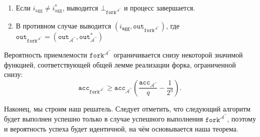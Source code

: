\documentclass{mrl}
\theoremstyle{definition}
\numberwithin{theorem}{subsection}
\newcommand{\adversary}{\mathcal{A}}
\begin{document}
\begin{description}
\begin{enumerate}
\item Если $i_{\text{agg}} \neq i_{\text{agg}}^*$, выводится $\bot_{\texttt{fork}^{\adversary^{\prime \prime}}}$ и процесс завершается.

\item В противном случае выводится $(i_{\texttt{agg}}, \texttt{out}_{\texttt{fork}^{\adversary^{\prime \prime}}})$, где $\texttt{out}_{\texttt{fork}^{\adversary^{\prime \prime}}} = (\texttt{out}_{\adversary^{\prime \prime}}, \texttt{out}_{\adversary^{\prime \prime}}^*)$
\end{enumerate}
\end{description}


Вероятность приемлемости $\texttt{fork}^{\adversary^{\prime \prime}}$ ограничивается снизу некоторой значимой функцией, соответствующей общей лемме реализации форка, ограниченной снизу:
\[\texttt{acc}_{\texttt{fork}^{\adversary^{\prime \prime}}}
\geq \texttt{acc}_{\adversary^{\prime\prime}} \left(\frac{\texttt{acc}_{\adversary^{\prime\prime}}}{q} - \frac{1}{2^\eta}\right).\]

Наконец, мы строим наш решатель. Следует отметить, что следующий алгоритм будет выполнен успешно только в случае успешного выполнения $\texttt{fork}^{\adversary^{\prime \prime}}$, поэтому и вероятность успеха будет идентичной, на чём основывается наша теорема.
\end{document}
